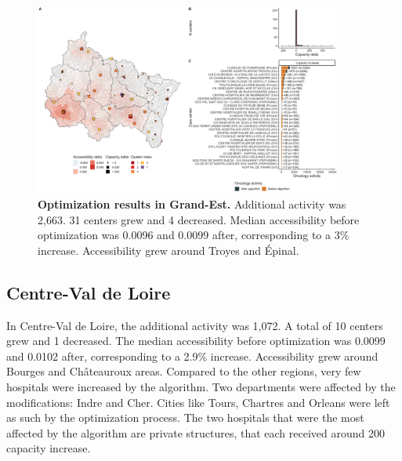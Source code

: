 \begin{figure}[H]
    \includegraphics[width=0.9\textwidth]{images/camion/optim_region/optim_Grand-Est.png}
    \centering
    \caption{ \textbf{Optimization results in Grand-Est.} Additional activity
        was 2,663. 31 centers grew and 4 decreased. Median accessibility before
        optimization was 0.0096 and 0.0099 after, corresponding to a 3\%
        increase. Accessibility grew around Troyes and Épinal. }
\end{figure}

\subsection*{Centre-Val de Loire}

In Centre-Val de Loire, the additional activity was 1,072. A total of 10 centers
grew and 1 decreased. The median accessibility before optimization was 0.0099 and
0.0102 after, corresponding to a 2.9\% increase. Accessibility grew around
Bourges and Châteauroux areas. Compared to the other regions, very few hospitals
were increased by the algorithm. Two departments were affected by the modifications:
Indre and Cher. Cities like Tours, Chartres and Orleans were left as such by
the optimization process. The two hospitals that were the most affected by the
algorithm are private structures, that each received around 200 capacity increase.


